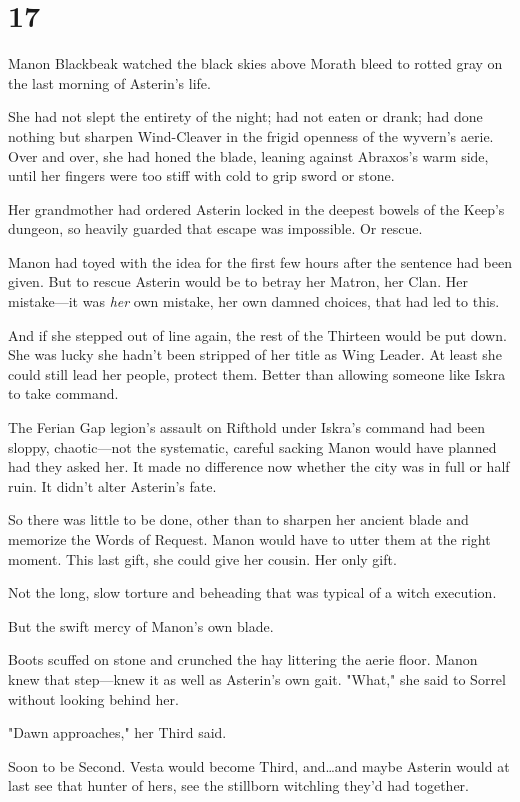 
\chapter{17}

Manon Blackbeak watched the black skies above Morath bleed to rotted gray on the last morning of Asterin's life.

She had not slept the entirety of the night; had not eaten or drank; had done nothing but sharpen Wind-Cleaver in the frigid openness of the wyvern's aerie.
Over and over, she had honed the blade, leaning against Abraxos's warm side, until her fingers were too stiff with cold to grip sword or stone.

Her grandmother had ordered Asterin locked in the deepest bowels of the Keep's dungeon, so heavily guarded that escape was impossible.
Or rescue.

Manon had toyed with the idea for the first few hours after the sentence had been given.
But to rescue Asterin would be to betray her Matron, her Clan.
Her mistake---it was \emph{her} own mistake, her own damned choices, that had led to this.

And if she stepped out of line again, the rest of the Thirteen would be put down.
She was lucky she hadn't been stripped of her title as Wing Leader.
At least she could still lead her people, protect them.
Better than allowing someone like Iskra to take command.

The Ferian Gap legion's assault on Rifthold under Iskra's command had been sloppy, chaotic---not the systematic, careful sacking Manon would have planned had they asked her.
It made no difference now whether the city was in full or half ruin.
It didn't alter Asterin's fate.

So there was little to be done, other than to sharpen her ancient blade and memorize the Words of Request.
Manon would have to utter them at the right moment.
This last gift, she could give her cousin.
Her only gift.

Not the long, slow torture and beheading that was typical of a witch execution.

But the swift mercy of Manon's own blade.

Boots scuffed on stone and crunched the hay littering the aerie floor.
Manon knew that step---knew it as well as Asterin's own gait.
"What," she said to Sorrel without looking behind her.

"Dawn approaches," her Third said.

Soon to be Second.
Vesta would become Third, and\ldots and maybe Asterin would at last see that hunter of hers, see the stillborn witchling they'd had together.

